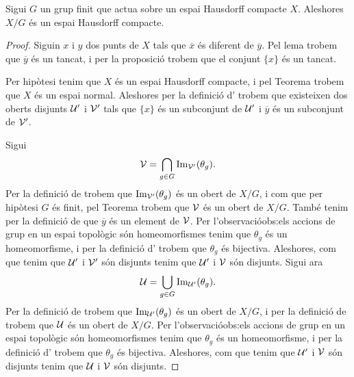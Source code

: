\documentclass[../Apunts.tex]{subfiles}
\begin{document}
	\begin{theorem}
		\label{thm:el quocient d'un Hausdorff compacte per un grup finit és Hausdorff compacte}
		Sigui \(G\) un grup finit que actua sobre un espai Hausdorff compacte \(X\). Aleshores \(X/G\) és un espai Hausdorff compacte.
		\begin{proof} %
			Siguin \(x\) i \(y\) dos punts de \(X\) tals que \(\overline{x}\) és diferent de \(\overline{y}\). Pel lema  trobem que \(\overline{y}\) és un tancat, i per la proposició  trobem que el conjunt \(\{x\}\) és un tancat.
			
			Per hipòtesi tenim que \(X\) és un espai Hausdorff compacte, i pel Teorema  trobem que \(X\) és un espai normal. Aleshores per la definició d' trobem que existeixen dos oberts disjunts \(\mathcal{U}'\) i \(\mathcal{V}'\) tals que \(\{x\}\) és un subconjunt de \(\mathcal{U}'\) i \(\overline{y}\) és un subconjunt de \(\mathcal{V}'\).
			
			Sigui
			\[\mathcal{V}=\bigcap_{g\in G}\operatorname{Im}_{\mathcal{V}'}(\theta_{g}).\]
			Per la definició de  trobem que \(\operatorname{Im}_{\mathcal{V}'}(\theta_{g})\) és un obert de \(X/G\), i com que per hipòtesi \(G\) és finit, pel Teorema  trobem que \(\mathcal{V}\) és un obert de \(X/G\). També tenim per la definició de  que \(\overline{y}\) és un element de \(\mathcal{V}\). Per l'observació{obs:els accions de grup en un espai topològic són homeomorfismes} tenim que \(\theta_{g}\) és un homeomorfisme, i per la definició d' trobem que \(\theta_{g}\) és bijectiva. Aleshores, com que tenim que \(\mathcal{U}'\) i \(\mathcal{V}'\) són disjunts tenim que \(\mathcal{U}'\) i \(\mathcal{V}\) són disjunts. Sigui ara
			\[\mathcal{U}=\bigcup_{g\in G}\operatorname{Im}_{\mathcal{U}'}(\theta_{g}).\]
			Per la definició de  trobem que \(\operatorname{Im}_{\mathcal{U}'}(\theta_{g})\) és un obert de \(X/G\), i per la definició de  trobem que \(\mathcal{U}\) és un obert de \(X/G\). Per l'observació{obs:els accions de grup en un espai topològic són homeomorfismes} tenim que \(\theta_{g}\) és un homeomorfisme, i per la definició d' trobem que \(\theta_{g}\) és bijectiva. Aleshores, com que tenim que \(\mathcal{U}'\) i \(\mathcal{V}\) són disjunts tenim que \(\mathcal{U}\) i \(\mathcal{V}\) són disjunts.
			

\end{proof}
\end{theorem}
\end{document}
